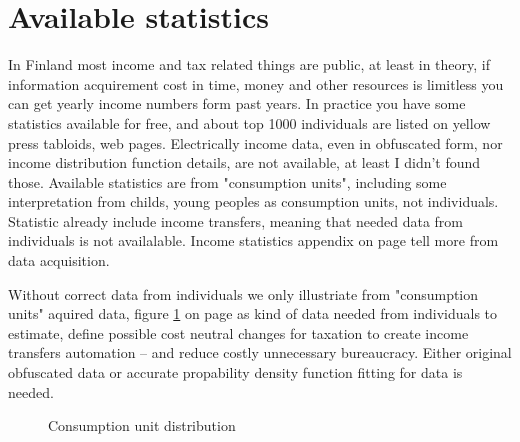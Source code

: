 \section{Available statistics}
\label{income tax statistics}
In Finland most income and tax related things are public, at least in theory,
if information acquirement cost in time, money and other resources
is limitless you can get yearly income numbers form past years.
In practice you have some statistics available for free,
and about top 1000 individuals are listed on yellow press tabloids, web pages.
Electrically income data, even in obfuscated form,
nor income distribution function details,
are not available, at least I didn't found those.
Available statistics are from "consumption units",
including some interpretation from childs,
young peoples as consumption units, not individuals.
Statistic already include income transfers,
meaning that needed data from individuals is not availalable.
Income statistics appendix on page \pageref{statistics} tell more from data acquisition.

Without correct data from individuals we only illustriate from "consumption units"
aquired data, figure \ref{fig:ConsumptionUnit} on page \pageref{fig:ConsumptionUnit}
as kind of data needed from individuals to estimate,
define possible cost neutral changes for taxation to create income
transfers automation -- and reduce costly unnecessary bureaucracy.
Either original obfuscated data or accurate propability density function fitting for data is needed.

\begin{figure} %
 \begin{center}
  \caption{Consumption unit distribution}
  \label{fig:ConsumptionUnit} 
 \end{center}
\end{figure}

